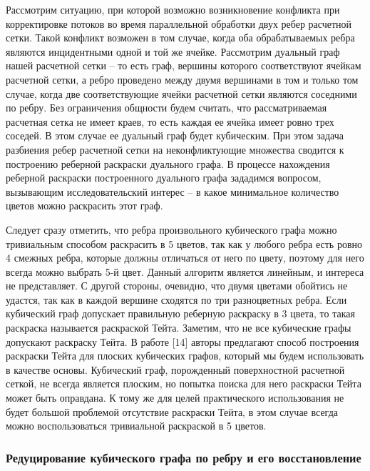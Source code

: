 Рассмотрим ситуацию, при которой возможно возникновение конфликта при корректировке потоков во время параллельной обработки двух ребер расчетной сетки.
Такой конфликт возможен в том случае, когда оба обрабатываемых ребра являются инцидентными одной и той же ячейке.
Рассмотрим дуальный граф нашей расчетной сетки – то есть граф, вершины которого соответствуют ячейкам расчетной сетки, а ребро проведено между двумя вершинами в том и только том случае, когда две соответствующие ячейки расчетной сетки являются соседними по ребру.
Без ограничения общности будем считать, что рассматриваемая расчетная сетка не имеет краев, то есть каждая ее ячейка имеет ровно трех соседей.
В этом случае ее дуальный граф будет кубическим.
При этом задача разбиения ребер расчетной сетки на неконфликтующие множества сводится к построению реберной раскраски дуального графа.
В процессе нахождения реберной раскраски построенного дуального графа зададимся вопросом, вызывающим  исследовательский интерес – в какое минимальное количество цветов можно раскрасить этот граф.

Следует сразу отметить, что ребра произвольного кубического графа можно тривиальным способом раскрасить в 5 цветов, так как у любого ребра есть ровно 4 смежных ребра, которые должны отличаться от него по цвету, поэтому для него всегда можно выбрать 5-й цвет.
Данный алгоритм является линейным, и интереса не представляет.
С другой стороны, очевидно, что двумя цветами обойтись не удастся, так как в каждой вершине сходятся по три разноцветных ребра.
Если кубический граф допускает правильную реберную раскраску в 3 цвета, то такая раскраска называется раскраской Тейта.
Заметим, что не все кубические графы допускают раскраску Тейта.
В работе [14] авторы предлагают способ построения раскраски Тейта для плоских кубических графов, который мы будем использовать в качестве основы.
Кубический граф, порожденный поверхностной расчетной сеткой, не всегда является плоским, но попытка поиска для него раскраски Тейта может быть оправдана.
К тому же для целей практического использования не будет большой проблемой отсутствие раскраски Тейта, в этом случае всегда можно воспользоваться тривиальной раскраской в 5 цветов.

\subsubsection{Редуцирование кубического графа по ребру и его восстановление}

